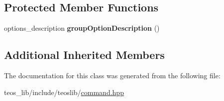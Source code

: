 \subsection*{Protected Member Functions}
\begin{DoxyCompactItemize}
\item 
\mbox{\label{classteos_1_1_command_options_ad9cb8c834296b2c5dee2a82c006bfa0c}} 
options\+\_\+description {\bfseries group\+Option\+Description} ()
\end{DoxyCompactItemize}
\subsection*{Additional Inherited Members}


The documentation for this class was generated from the following file\+:\begin{DoxyCompactItemize}
\item 
teos\+\_\+lib/include/teoslib/\mbox{\hyperlink{command_8hpp}{command.\+hpp}}\end{DoxyCompactItemize}

